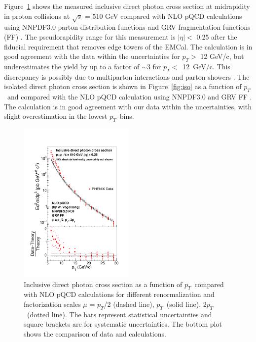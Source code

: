 \documentclass[twocolumn,letterpaper,aps,prl,longbibliography,superscriptaddress,floatfix]{revtex4-2}
\newcommand{\pT}{\ensuremath{p_T}}
\begin{document}
Figure~\ref{fig:inc} shows the measured inclusive direct photon cross section at midrapidity in proton collisions at $\sqrt{s}$ = 510 GeV compared with NLO pQCD calculations \cite{PhysRevD.48.3136, PhysRevD.50.1901} using NNPDF3.0 parton distribution functions \cite{Ball2015, Bonvini2015} and GRV fragmentation functions (FF) \cite{PhysRevD.45.3986}. The pseudorapidity range for this measurement is $|\eta| <$ 0.25 after the fiducial requirement that removes edge towers of the EMCal. The calculation is in good agreement with the data within the uncertainties for $p_T >$ 12 GeV/c, but underestimates the yield by up to a factor of $\sim$3 for \mbox{$p_T <$ 12 GeV/c}. This discrepancy is possibly due to multiparton interactions and parton showers \cite{Nason_2004, Frixione_2007, Alioli2010, Jezo2016, Klasen2018}. The isolated direct photon cross section is shown in Figure~\ref{fig:iso} as a function of \pT\ and compared with the NLO pQCD calculation \cite{PhysRevD.48.3136, PhysRevD.50.1901} using NNPDF3.0 \cite{Ball2015, Bonvini2015} and GRV FF \cite{PhysRevD.45.3986}. The calculation is in good agreement with our data within the uncertainties, with slight overestimation in the lowest \pT\ bins.

\begin{figure}
\includegraphics[width=0.5\textwidth]{CrossSection-photon-werner}
\caption{Inclusive direct photon cross section as a function of \pT\ compared with NLO pQCD calculations \cite{PhysRevD.48.3136, PhysRevD.50.1901} for different renormalization and factorization scales $\mu$ = \pT/2 (dashed line), \pT\ (solid line), 2\pT\ (dotted line). The bars represent statistical uncertainties and square brackets are for systematic uncertainties. The bottom plot shows the comparison of data and calculations.}
\label{fig:inc}
\end{figure}
\end{document}
